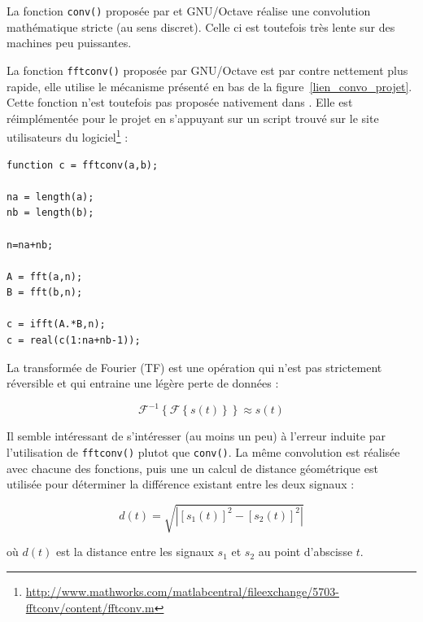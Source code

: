 La fonction \texttt{conv()} proposée par \matlab et GNU/Octave réalise une convolution mathématique stricte (au sens
discret). Celle ci est toutefois très lente sur des machines peu puissantes.

La fonction \texttt{fftconv()} proposée par GNU/Octave est par contre nettement plus rapide, elle utilise le mécanisme
présenté en bas de la figure~\ref{lien_convo_projet}. Cette fonction n'est toutefois pas proposée nativement dans
\matlab. Elle est réimplémentée pour le projet en s'appuyant sur un script trouvé sur le site utilisateurs du
logiciel\footnote{\url{http://www.mathworks.com/matlabcentral/fileexchange/5703-fftconv/content/fftconv.m}} :

\begin{Verbatim}[samepage=true]
function c = fftconv(a,b);

na = length(a);
nb = length(b);

n=na+nb;

A = fft(a,n);
B = fft(b,n);

c = ifft(A.*B,n);
c = real(c(1:na+nb-1));
\end{Verbatim}

La transformée de Fourier (TF) est une opération qui n'est pas strictement réversible et qui entraine une légère perte de
données :

$$\mathcal{F}^{-1}\left\{\mathcal{F}\left\{s(t)\right\}\right\} \approx s(t)$$


Il semble intéressant de s'intéresser (au moins un peu) à l'erreur induite par l'utilisation de \texttt{fftconv()}
plutot que \texttt{conv()}. La même convolution est réalisée avec chacune des fonctions, puis une un calcul de distance
géométrique est utilisée pour déterminer la différence existant entre les deux signaux : 

$$ d(t) = \sqrt{\left|\left[s_1(t)\right]^2 - \left[s_2(t)\right]^2\right|}$$

où $d(t)$ est la distance entre les signaux $s_1$ et $s_2$ au point d'abscisse $t$.

